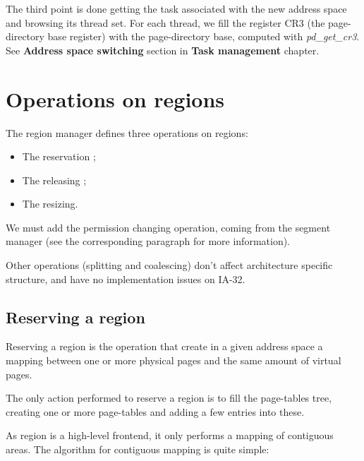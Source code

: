 The third point is done getting the task associated with the new
address space and browsing its thread set. For each thread, we fill
the register CR3 (the page-directory base register) with the
page-directory base, computed with \textit{pd\_get\_cr3}. See
\textbf{Address space switching} section in \textbf{Task management}
chapter.

%
%

\section{Operations on regions}

The region manager defines three operations on regions:

\begin{itemize}
\item The reservation ;
\item The releasing ;
\item The resizing.
\end{itemize}

We must add the permission changing operation, coming from the segment
manager (see the corresponding paragraph for more information).

Other operations (splitting and coalescing) don't affect architecture
specific structure, and have no implementation issues on IA-32.

%
%

\subsection{Reserving a region}

Reserving a region is the operation that create in a given address
space a mapping between one or more physical pages and the same amount
of virtual pages.

The only action performed to reserve a region is to fill the
page-tables tree, creating one or more page-tables and adding a few
entries into these.

As region is a high-level frontend, it only performs a mapping of
contiguous areas. The algorithm for contiguous mapping is quite simple:

